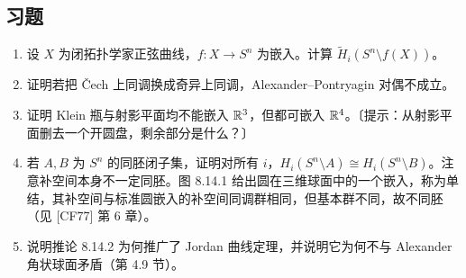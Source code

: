 \subsection*{习题}
\begin{enumerate}
\item 设 $X$ 为闭拓扑学家正弦曲线，$f:X\to S^n$ 为嵌入。计算 $\widetilde H_i(S^n\setminus f(X))$。
\item 证明若把 Čech 上同调换成奇异上同调，Alexander--Pontryagin 对偶不成立。
\item 证明 Klein 瓶与射影平面均不能嵌入 $\mathbb{R}^3$，但都可嵌入 $\mathbb{R}^4$。〔提示：从射影平面删去一个开圆盘，剩余部分是什么？〕
\item 若 $A,B$ 为 $S^n$ 的同胚闭子集，证明对所有 $i$，$H_i(S^n\setminus A)\cong H_i(S^n\setminus B)$。注意补空间本身不一定同胚。图 8.14.1 给出圆在三维球面中的一个嵌入，称为单结，其补空间与标准圆嵌入的补空间同调群相同，但基本群不同，故不同胚（见 [CF77] 第 6 章）。
\item 说明推论 8.14.2 为何推广了 Jordan 曲线定理，并说明它为何不与 Alexander 角状球面矛盾（第 4.9 节）。
\end{enumerate}
